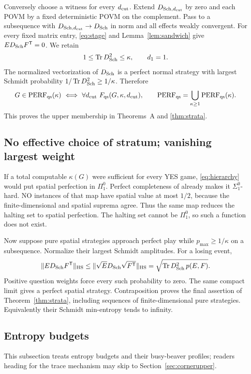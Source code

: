 Conversely choose a witness for every ${d_{\rm cut}}$. Extend $D_{{\rm Sch},{d_{\rm cut}}}$ by zero and each POVM by a fixed deterministic POVM on the complement. Pass to a subsequence with $D_{{\rm Sch},{d_{\rm cut}}}\to D_{\rm Sch}$ in norm and all effects weakly convergent. For every fixed matrix entry, \eqref{eq:stage} and Lemma~\ref{lem:sandwich} give $ED_{\rm Sch}F^{\mathsf T}=0$. We retain
\[
 1\leq\operatorname{Tr} D_{\rm Sch}^2\leq \kappa,\qquad d_1=1.
\]
The normalized vectorization of $D_{\rm Sch}$ is a perfect normal strategy with largest Schmidt probability $1/\operatorname{Tr} D_{\rm Sch}^2\geq1/\kappa$. Therefore
\begin{equation}\label{eq:hierarchy}
 G\in\perf_{\qs}(\kappa)\ \Longleftrightarrow\ \forall {d_{\rm cut}}\ F_\qs(G,\kappa,{d_{\rm cut}}),
 \qquad \perf_{\qs}=\bigcup_{\kappa\geq1}\perf_{\qs}(\kappa).
\end{equation}
This proves the upper membership in Theorems~A and \ref{thm:strata}.

\subsection{No effective choice of stratum; vanishing largest weight}
If a total computable $\kappa(G)$ were sufficient for every YES game, \eqref{eq:hierarchy} would put spatial perfection in $\Pi^0_1$. Perfect completeness of \cite[Theorem 12.6]{MIPRE} already makes it $\Sigma^0_1$-hard. NO instances of that map have spatial value at most $1/2$, because the finite-dimensional and spatial suprema agree. Thus the same map reduces the halting set to spatial perfection. The halting set cannot be $\Pi^0_1$, so such a function does not exist.

Now suppose pure spatial strategies approach perfect play while $p_{\max}\geq1/\kappa$ on a subsequence. Normalize their largest Schmidt amplitudes. For a losing event,
\[
 \|ED_{\rm Sch}F^{\mathsf T}\|_{\rm HS}
 \leq\|\sqrt E D_{\rm Sch}\sqrt{F^{\mathsf T}}\|_{\rm HS}
 =\sqrt{\operatorname{Tr} D_{\rm Sch}^2\,p(E,F)}.
\]
Positive question weights force every such probability to zero. The same compact limit gives a perfect spatial strategy. Contraposition proves the final assertion of Theorem~\ref{thm:strata}, including sequences of finite-dimensional pure strategies. Equivalently their Schmidt min-entropy tends to infinity.

\subsection{Entropy budgets}\label{sec:finS}\label{sec:entropybudgets}
This subsection treats entropy budgets and their busy-beaver profiles; readers heading for the trace mechanism may skip to Section~\ref{sec:cornerupper}.

